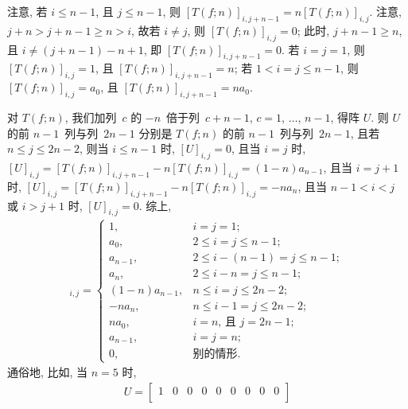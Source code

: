 \documentclass[../libro.tex]{subfiles}
\begin{document}
\begin{example}
    注意, 若 \(i \leq n-1\), 且 \(j \leq n-1\),
    则 \([T(f; n)]_{i,j+n-1} = n [T(f; n)]_{i,j}\).
    注意, \(j + n > j + n - 1 \geq n > i\),
    故若 \(i \neq j\), 则 \([T(f; n)]_{i,j} = 0\);
    此时, \(j + n - 1 \geq n\),
    且 \(i \neq (j + n - 1) - n + 1\),
    即 \([T(f; n)]_{i,j+n-1} = 0\).
    若 \(i = j = 1\),
    则 \([T(f; n)]_{i,j} = 1\),
    且 \([T(f; n)]_{i,j+n-1} = n\);
    若 \(1 < i = j \leq n - 1\),
    则 \([T(f; n)]_{i,j} = a_0\),
    且 \([T(f; n)]_{i,j+n-1} = n a_0\).

    对 \(T(f; n)\),
    我们加列~\(c\) 的 \(-n\)~倍于列~\(c+n-1\),
    \(c = 1\), \(\dots\), \(n-1\),
    得阵 \(U\).
    则 \(U\) 的前 \(n-1\)~列与列~\(2n-1\)
    分别是 \(T(f; n)\) 的前 \(n-1\)~列与列~\(2n-1\),
    且若 \(n \leq j \leq 2n-2\),
    则当 \(i \leq n - 1\) 时, \([U]_{i,j} = 0\),
    且当 \(i = j\) 时,
    \([U]_{i,j} \allowbreak
        = [T(f; n)]_{i,j+n-1} - n [T(f; n)]_{i,j}
    = (1 - n) a_{n-1}\),
    且当 \(i = j + 1\) 时,
    \([U]_{i,j} \allowbreak
        = [T(f; n)]_{i,j+n-1} - n [T(f; n)]_{i,j}
    = -n a_n\),
    且当 \(n - 1 < i < j\) 或 \(i > j + 1\) 时,
    \([U]_{i,j} = 0\).
    综上,
    \begin{align*}
        [U]_{i,j} =
        \begin{cases}
            1,             & i = j = 1;                           \\
            a_0,           & 2 \leq i = j \leq n - 1;             \\
            a_{n-1},       & 2 \leq i - (n - 1) = j \leq n - 1;   \\
            a_n,           & 2 \leq i - n = j \leq n - 1;         \\
            (1-n) a_{n-1}, & n \leq i = j \leq 2n - 2;            \\
            -n a_n,        & n \leq i - 1 = j \leq 2n - 2;        \\
            n a_0,         & \text{\(i = n\), 且 \(j = 2n - 1\)}; \\
            a_{n-1},       & i = j = n;                           \\
            0,             & \text{别的情形}.
        \end{cases}
    \end{align*}
    通俗地, 比如, 当 \(n = 5\) 时,
    \begin{align*}
        U =
        \begin{bmatrix}
            1   & 0   & 0   & 0   & 0     & 0     & 0     & 0     & 0    \\

\end{bmatrix}
\end{align*}
\end{example}
\end{document}
